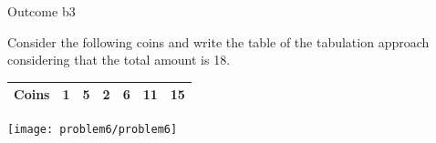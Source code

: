 \begin{problem}{Outcome b}{3}

Consider the following coins and write the table of the tabulation approach considering that the total amount is 18.

\begin{center}
    \begin{tabular}{ |c|c|c|c|c|c|c| } 
        \hline
        \textbf{Coins}  & 1 & 5 & 2 & 6 & 11 & 15 \\ 
        \hline
    \end{tabular}
    \newline
\end{center}

 \begin{center}
    \texttt{[image: problem6/problem6]}%
\end{center}

\end{problem}





